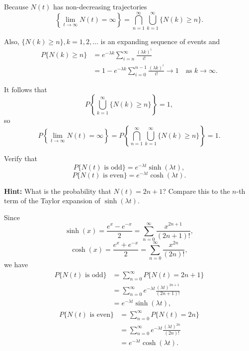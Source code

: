 \begin{Solution}
Because $N(t)$ has non-decreasing trajectories
\[
\left\{\lim_{t \to \infty} N(t) = \infty\right\} = \bigcap_{n=1}^{\infty} \bigcup_{k=1}^{\infty} \{N(k) \geq n\}.
\]

Also, $\{N(k) \geq n\}, k = 1, 2, \ldots$ is an expanding sequence of events and
\begin{equation}
\begin{aligned}
P\{N(k) \geq n\} &= e^{-\lambda k} \sum_{i=n}^{\infty} \frac{(\lambda k)^i}{i!} \\
&= 1 - e^{-\lambda k} \sum_{i=0}^{n-1} \frac{(\lambda k)^i}{i!} \to 1 \quad \text{as } k \to \infty.
\end{aligned}
\end{equation}

It follows that
\[
P\left\{\bigcup_{k=1}^{\infty} \{N(k) \geq n\}\right\} = 1,
\]
so
\[
P\left\{\lim_{t \to \infty} N(t) = \infty\right\} = P\left\{\bigcap_{n=1}^{\infty} \bigcup_{k=1}^{\infty} \{N(k) \geq n\}\right\} = 1.
\]
\end{Solution}

\begin{Exercise}
\label{ex:poisson-odd-even}
Verify that
\[
P\{N(t) \text{ is odd}\} = e^{-\lambda t} \sinh(\lambda t),
\]
\[
P\{N(t) \text{ is even}\} = e^{-\lambda t} \cosh(\lambda t).
\]

\noindent\textbf{Hint:} What is the probability that $N(t) = 2n + 1$? Compare this to the $n$-th term of the Taylor expansion of $\sinh(\lambda t)$.
\end{Exercise}

\begin{Solution}
Since
\[
\sinh(x) = \frac{e^x - e^{-x}}{2} = \sum_{n=0}^{\infty} \frac{x^{2n+1}}{(2n+1)!},
\]
\[
\cosh(x) = \frac{e^x + e^{-x}}{2} = \sum_{n=0}^{\infty} \frac{x^{2n}}{(2n)!},
\]
we have
\begin{equation}
\begin{aligned}
P\{N(t) \text{ is odd}\} &= \sum_{n=0}^{\infty} P\{N(t) = 2n+1\} \\
&= \sum_{n=0}^{\infty} e^{-\lambda t} \frac{(\lambda t)^{2n+1}}{(2n+1)!} \\
&= e^{-\lambda t} \sinh(\lambda t),
\end{aligned}
\end{equation}
\begin{equation}
\begin{aligned}
P\{N(t) \text{ is even}\} &= \sum_{n=0}^{\infty} P\{N(t) = 2n\} \\
&= \sum_{n=0}^{\infty} e^{-\lambda t} \frac{(\lambda t)^{2n}}{(2n)!} \\
&= e^{-\lambda t} \cosh(\lambda t).
\end{aligned}
\end{equation}
\end{Solution}

